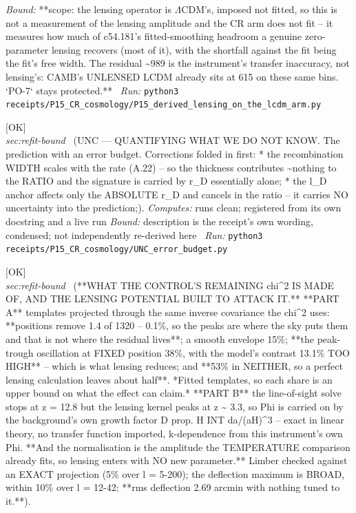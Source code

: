 \begin{description}
 \emph{Bound:} **scope: the lensing operator is \ensuremath{\Lambda}CDM's, imposed not fitted, so this is not a measurement of the lensing amplitude and the CR arm does not fit -- it measures how much of c54.181's fitted-smoothing headroom a genuine zero-parameter lensing recovers (most of it), with the shortfall against the fit being the fit's free width. The residual \textasciitilde{}989 is the instrument's transfer inaccuracy, not lensing's: CAMB's UNLENSED LCDM already sits at 615 on these same bins. `PO-7` stays protected.**
\ \emph{Run:} \texttt{python3 receipts/P15\_CR\_cosmology/P15\_derived\_lensing\_on\_the\_lcdm\_arm.py}
\item[\label{rcpt:UNC_error_budget}\texttt{UNC\_error\_budget}]\hfill\textsf{[OK]}\\
\textit{sec:refit-bound} \ (UNC --- QUANTIFYING WHAT WE DO NOT KNOW. The prediction with an error budget. Corrections folded in first: * the recombination WIDTH scales with the rate (A.22) -- so the thickness contributes \textasciitilde{}nothing to the RATIO and the signature is carried by r\_D essentially alone; * the l\_D anchor affects only the ABSOLUTE r\_D and cancels in the ratio -- it carries NO uncertainty into the prediction;). 
\emph{Computes:} runs clean; registered from its own docstring and a live run
 \emph{Bound:} description is the receipt's own wording, condensed; not independently re-derived here
\ \emph{Run:} \texttt{python3 receipts/P15\_CR\_cosmology/UNC\_error\_budget.py}
\item[\label{rcpt:P15_the_residual_is_contrast_and_the_lensing_potential_is_derived}\texttt{P15\_the\_residual\_is\_contrast\_and\_the\_lensing\_potential\_is\_derived}]\hfill\textsf{[OK]}\\
\textit{sec:refit-bound} \ (**WHAT THE CONTROL'S REMAINING chi\textasciicircum{}2 IS MADE OF, AND THE LENSING POTENTIAL BUILT TO ATTACK IT.** **PART A** templates projected through the same inverse covariance the chi\textasciicircum{}2 uses: **positions remove 1.4 of 1320 -- 0.1\%, so the peaks are where the sky puts them and that is not where the residual lives**; a smooth envelope 15\%; **the peak-trough oscillation at FIXED position 38\%, with the model's contrast 13.1\% TOO HIGH** -- which is what lensing reduces; and **53\% in NEITHER, so a perfect lensing calculation leaves about half**. *Fitted templates, so each share is an upper bound on what the effect can claim.* **PART B** the line-of-sight solve stops at z = 12.8 but the lensing kernel peaks at z \textasciitilde{} 3.3, so Phi is carried on by the background's own growth factor D prop. H INT da/(aH)\textasciicircum{}3 -- exact in linear theory, no transfer function imported, k-dependence from this instrument's own Phi. **And the normalisation is the amplitude the TEMPERATURE comparison already fits, so lensing enters with NO new parameter.** Limber checked against an EXACT projection (5\% over l = 5-200); the deflection maximum is BROAD, within 10\% over l = 12-42; **rms deflection 2.69 arcmin with nothing tuned to it.**). 

\end{description}
